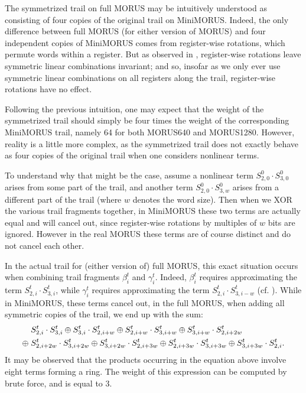\documentclass{llncs}
\newcommand{\cipher}[1]{\textsf{#1}}
\begin{document}
The symmetrized trail on full \cipher{MORUS} may be intuitively understood as consisting of four copies of the original trail on \cipher{MiniMORUS}. Indeed, the only difference between full \cipher{MORUS} (for either version of \cipher{MORUS}) and four independent copies of \cipher{MiniMORUS} comes from register-wise rotations, which permute words within a register. But as observed in , register-wise rotations leave symmetric linear combinations invariant; and so, insofar as we only ever use symmetric linear combinations on all registers along the trail, register-wise rotations have no effect.

Following the previous intuition, one may expect that the weight of the symmetrized trail should simply be four times the weight of the corresponding \cipher{MiniMORUS} trail, namely 64 for both \cipher{MORUS640} and \cipher{MORUS1280}. However, reality is a little more complex, as the symmetrized trail does not exactly behave as four copies of the original trail when one considers nonlinear terms.

To understand why that might be the case, assume a nonlinear term $S^0_{2,0} \cdot S^0_{3,0}$ arises from some part of the trail, and another term $S^0_{2,0} \cdot S^0_{3,w}$ arises from a different part of the trail (where $w$ denotes the word size). Then when we XOR the various trail fragments together, in \cipher{MiniMORUS} these two terms are actually equal and will cancel out, since register-wise rotations by multiples of $w$ bits are ignored. However in the real \cipher{MORUS} these terms are of course distinct and do not cancel each other.

In the actual trail for (either version of) full \cipher{MORUS}, this exact situation occurs when combining trail fragments $\beta^t_i$ and $\gamma^t_i$. Indeed, $\beta^t_i$ requires approximating the term $S^t_{2,i} \cdot S^t_{3,i}$, while $\gamma^t_i$ requires approximating the term $S^t_{2,i} \cdot S^t_{3,i-w}$ (cf. ). While in \cipher{MiniMORUS}, these terms cancel out, in the full \cipher{MORUS}, when adding all symmetric copies of the trail, we end up with the sum:
\begin{align}
&S^t_{2,i} \cdot S^t_{3,i} \oplus S^t_{3,i} \cdot S^t_{2,i+w}
\oplus S^t_{2,i+w} \cdot S^t_{3,i+w} \oplus S^t_{3,i+w} \cdot S^t_{2,i+2w}\notag\\
\oplus\; &S^t_{2,i+2w} \cdot S^t_{3,i+2w} \oplus S^t_{3,i+2w} \cdot S^t_{2,i+3w}
\oplus S^t_{2,i+3w} \cdot S^t_{3,i+3w} \oplus S^t_{3,i+3w} \cdot S^t_{2,i}.\label{eq:8circle}
\end{align}
It may be observed that the products occurring in the equation above involve eight terms forming a ring. The weight of this expression can be computed by brute force, and is equal to $3$.
\end{document}
